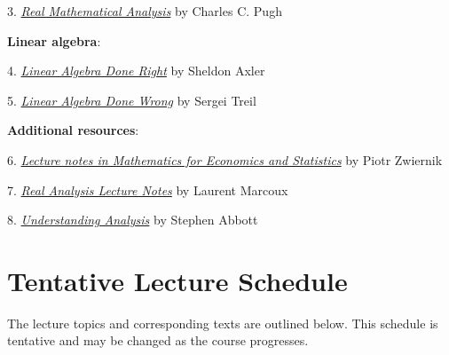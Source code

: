 \documentclass[12pt]{article}
\begin{document}

3. \href{https://link-springer-com.myaccess.library.utoronto.ca/book/10.1007/978-3-319-17771-7}{\emph{Real Mathematical Analysis}} by Charles C. Pugh

\vspace{1em}

\noindent
{\bf{Linear algebra}}:

\vspace{0.1cm}

4. \href{https://link-springer-com.myaccess.library.utoronto.ca/book/10.1007/978-3-319-11080-6}{{\emph{Linear Algebra Done Right}}} by Sheldon Axler

5. \href{https://www.math.brown.edu/streil/papers/LADW/LADW.html}{{\emph{Linear Algebra Done Wrong}}} by Sergei Treil

\vspace{1em}

\noindent
{\bf{Additional resources}}:
\vspace{0.1cm}

6. \href{http://84.89.132.1/~piotr/docs/RealAnalysisNotes.pdf}{\emph{Lecture notes in Mathematics for Economics and Statistics}} by Piotr Zwiernik

7. \href{http://www.math.uwaterloo.ca/~lwmarcou/notes/pmath351.pdf}{{\emph{Real Analysis Lecture Notes}}} by Laurent Marcoux

8.  \href{https://link-springer-com.myaccess.library.utoronto.ca/book/10.1007/978-1-4939-2712-8}{{\emph{Understanding Analysis}}} by Stephen Abbott

%
%




\section{Tentative Lecture Schedule}
The lecture topics and corresponding texts are outlined below.  This schedule is tentative and may be changed as the course progresses.
\end{document}
